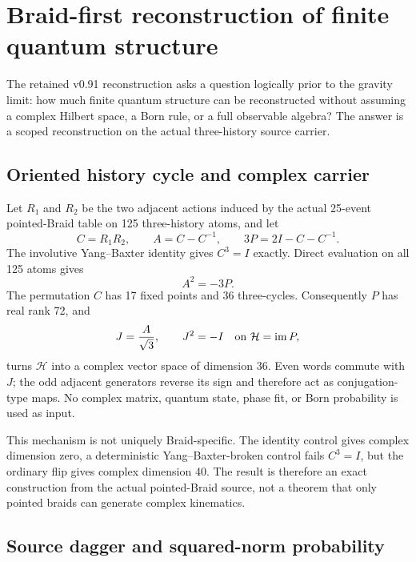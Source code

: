 \documentclass[11pt]{article}
\theoremstyle{definition}
\theoremstyle{remark}
\begin{document}
\section{Braid-first reconstruction of finite quantum structure}\label{sec:quantumreconstruction091}

The retained v0.91 reconstruction asks a question logically prior to the gravity limit: how much finite quantum structure can be reconstructed without assuming a complex Hilbert space, a Born rule, or a full observable algebra? The answer is a scoped reconstruction on the actual three-history source carrier.

\subsection{Oriented history cycle and complex carrier}

Let $R_1$ and $R_2$ be the two adjacent actions induced by the actual 25-event pointed-Braid table on 125 three-history atoms, and let
\begin{equation}
 C=R_1R_2,\qquad
 A=C-C^{-1},\qquad
 3P=2I-C-C^{-1}.
\end{equation}
The involutive Yang--Baxter identity gives $C^3=I$ exactly. Direct evaluation on all 125 atoms gives
\begin{equation}
 A^2=-3P.
\end{equation}
The permutation $C$ has 17 fixed points and 36 three-cycles. Consequently $P$ has real rank 72, and
\begin{equation}
 J=\frac{A}{\sqrt3},\qquad J^2=-I\quad\hbox{on }\mathcal H=\operatorname{im}P,
\end{equation}
turns $\mathcal H$ into a complex vector space of dimension 36. Even words commute with $J$; the odd adjacent generators reverse its sign and therefore act as conjugation-type maps. No complex matrix, quantum state, phase fit, or Born probability is used as input.

This mechanism is not uniquely Braid-specific. The identity control gives complex dimension zero, a deterministic Yang--Baxter-broken control fails $C^3=I$, but the ordinary flip gives complex dimension 40. The result is therefore an exact construction from the actual pointed-Braid source, not a theorem that only pointed braids can generate complex kinematics.

\subsection{Source dagger and squared-norm probability}
\end{document}
